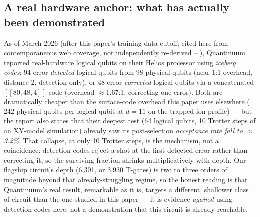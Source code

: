 \documentclass[9pt,twocolumn]{extarticle}
\begin{document}
\subsection{A real hardware anchor: what has actually been demonstrated}
As of March 2026 (after this paper's training-data cutoff; cited here from
contemporaneous web coverage, not independently re-derived --
\cite{quantinuum2026iceberg}), Quantinuum reported real-hardware logical
qubits on their Helios processor using \emph{iceberg codes}: 94
error-\emph{detected} logical qubits from 98 physical qubits (near
1:1 overhead, distance-2, detection only), or 48 error-\emph{corrected}
logical qubits via a concatenated $[[80,48,4]]$ code (overhead
$\approx$1.67:1, correcting one error). Both are dramatically
cheaper than the surface-code overhead this paper uses elsewhere
($242$ physical qubits per logical qubit at $d=11$ on the trapped-ion profile) --- but the
report also states that their deepest test (64 logical qubits, 10 Trotter
steps of an XY-model simulation) already saw its post-selection
\emph{acceptance rate fall to $\approx$3.2\%}. That collapse, at only 10
Trotter steps, is the mechanism, not a coincidence: detection codes reject
a shot at the first detected error rather than correcting it, so the
surviving fraction shrinks multiplicatively with depth. Our flagship
circuit's depth (6{,}301, or 3{,}930 T-gates) is two to three orders of
magnitude beyond that already-struggling regime, so the honest reading is
that Quantinuum's real result, remarkable as it is, targets a
different, shallower class of circuit than the one studied in this paper
--- it is evidence \emph{against} using detection codes here, not a
demonstration that this circuit is already reachable.
\end{document}
